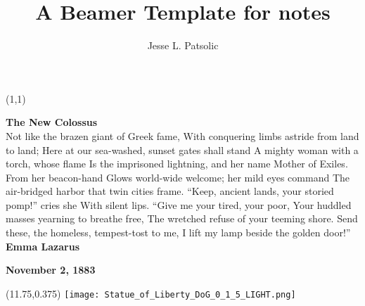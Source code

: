 \documentclass[xcolor=dvipsnames, aspectratio=169]{beamer}
\title[Daily Notes]{A Beamer Template for notes}
\subtitle[]{}
\author[JLP]{Jesse L. Patsolic}
\begin{document}
\begin{frame}[plain]
\begin{textblock}{3.25}(1,1)
    {\color{black}
\tiny
\textbf{The New Colossus}\\

Not like the brazen giant of Greek fame,
With conquering limbs astride from land to land;
Here at our sea-washed, sunset gates shall stand
A mighty woman with a torch, whose flame
Is the imprisoned lightning, and her name
Mother of Exiles. From her beacon-hand
Glows world-wide welcome; her mild eyes command
The air-bridged harbor that twin cities frame.
``Keep, ancient lands, your storied pomp!'' cries she
With silent lips. ``Give me your tired, your poor,
Your huddled masses yearning to breathe free,
The wretched refuse of your teeming shore.
Send these, the homeless, tempest-tost to me,
I lift my lamp beside the golden door!''\\


\textbf{Emma Lazarus}

\textbf{November 2, 1883}
}
\end{textblock}

\begin{textblock}{5}(11.75,0.375)
\texttt{[image: Statue\_of\_Liberty\_DoG\_0\_1\_5\_LIGHT.png]}

\end{textblock}
\end{frame}
\end{document}

